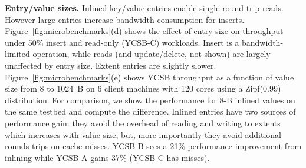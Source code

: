 \textbf{Entry/value sizes.} \label{sec:entry_size} 
Inlined key/value entries enable single-round-trip
reads. However large entries increase bandwidth consumption for inserts.
Figure~\ref{fig:microbenchmarks}(d) shows the effect of entry size on throughput under 50\% insert
and read-only (YCSB-C) workloads. Insert is a bandwidth-limited operation,
while reads (and update/delete, not shown)
are largely unaffected by entry size.
%
%
Extent entries are slightly slower.
Figure~\ref{fig:microbenchmarks}(e) shows YCSB throughput as a function of
value size from 8 to 1024~B on 6 client machines with 120 cores using a
Zipf(0.99) distribution.  For
comparison, we show the performance for 8-B inlined values on the same
testbed and compute the difference.  
Inlined entries have two sources of performance gain: they avoid the overhead of reading and
writing to extents which increases with value size, but, more importantly they avoid additional rounds trips on cache
misses. YCSB-B sees a 21\% performance improvement from inlining while YCSB-A gains 37\% (YCSB-C has misses).



